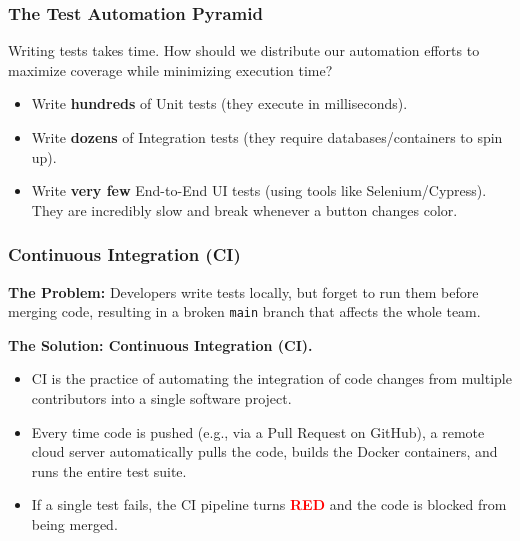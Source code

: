 \documentclass[xcolor=table]{beamer}
\begin{document}
\begin{frame}
    \frametitle{The Test Automation Pyramid}
    Writing tests takes time. How should we distribute our automation efforts to maximize coverage while minimizing execution time?
    
    \centering
    
    \begin{itemize}
        \item Write \textbf{hundreds} of Unit tests (they execute in milliseconds).
        \item Write \textbf{dozens} of Integration tests (they require databases/containers to spin up).
        \item Write \textbf{very few} End-to-End UI tests (using tools like Selenium/Cypress). They are incredibly slow and break whenever a button changes color.
    \end{itemize}
\end{frame}

\begin{frame}
    \frametitle{Continuous Integration (CI)}
    \textbf{The Problem:} Developers write tests locally, but forget to run them before merging code, resulting in a broken \texttt{main} branch that affects the whole team.
    
    \textbf{The Solution: Continuous Integration (CI).}
    \begin{itemize}
        \item CI is the practice of automating the integration of code changes from multiple contributors into a single software project.
        \item Every time code is pushed (e.g., via a Pull Request on GitHub), a remote cloud server automatically pulls the code, builds the Docker containers, and runs the entire test suite.
        \item If a single test fails, the CI pipeline turns \textcolor{red}{\textbf{RED}} and the code is blocked from being merged.
    \end{itemize}
\end{frame}
\end{document}
